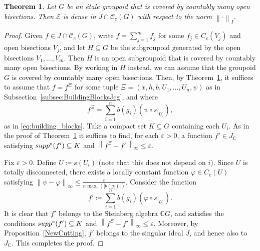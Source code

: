 \documentclass[10pt,a4paper]{amsart}
\newtheorem{thm}{Theorem}
\newcommand{\abs}[1]{\left\vert#1\right\vert}
\newcommand{\cg}{\mathscr{C}_c(G)}
\newcommand{\norm}[1]{\left\|#1\right\|}
\newcommand{\osupp}{\supp^{\circ}}
\newcommand{\supp}{{\rm supp}}
\begin{document}
\begin{thm}\label{SpanJcg}
    Let $G$ be an \'etale groupoid that is covered by countably many open bisections. Then $\mathcal{E}$ is dense in $J \cap \cg$ with respect to the norm $\norm{\cdot}_I$.
\end{thm}

\begin{proof}
    Given $f \in J \cap \cg$, write $f = \sum_{j=1}^m f_j$ for some $f_j \in C_c(V_j)$ and open bisections $V_j$, and let $H \subseteq G$ be the subgroupoid generated by the open bisections $V_1, \dots, V_m$. Then $H$ is an open subgroupoid that is covered by countably many open bisections. By working in $H$ instead, we can assume that the groupoid $G$ is covered by countably many open bisections. Then, by Theorem~\ref{SpanJcg}, it suffices to assume that $f = f^\Xi$ for some tuple $\Xi = (x, h, b, U_1, \dots, U_n, \psi)$ as in Subsection~\ref{subsec:BuildingBlocksJcg}, and where
    \[
    f^\Xi = \sum_{i=1}^n b(g_i) (\psi \circ s|_{U_i}),
    \]
    as in \eqref{eq:building_blocks}. Take a compact set $K \subseteq G$ containing each $U_i$. As in the proof of Theorem~\ref{SpanJcg} it suffices to find, for each $\varepsilon>0$, a function $f' \in J_{\mathbb{C}}$ satisfying $\osupp(f') \subseteq K$ and $\norm{f^\Xi-f'}_\infty \le \varepsilon$.
    
    Fix $\varepsilon>0$. Define $U \coloneq s(U_i)$ (note that this does not depend on $i$). Since $U$ is totally disconnected, there exists a locally constant function $\varphi \in C_c(U)$ satisfying $\norm{\psi - \varphi}_\infty \le \frac{\varepsilon}{n \max_i(\abs{b(g_i)})}$. Consider the function
    \[
    f' \coloneq \sum_{i=1}^n b(g_i) (\varphi \circ s|_{U_i}).
    \]
    It is clear that $f'$ belongs to the Steinberg algebra $\mathbb{C}G$, and satisfies the conditions $\osupp(f') \subseteq K$ and $\norm{f^\Xi-f'}_\infty \le \varepsilon$. Moreover, by Proposition~\ref{NewCutting}, $f'$ belongs to the singular ideal $J$, and hence also to $J_\mathbb{C}$. This completes the proof.
\end{proof}
\end{document}
